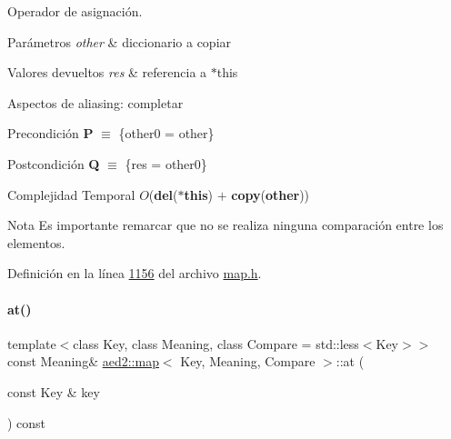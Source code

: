 Operador de asignación. 


\begin{DoxyParams}{Parámetros}
{\em other} & diccionario a copiar \\
\hline
\end{DoxyParams}

\begin{DoxyRetVals}{Valores devueltos}
{\em res} & referencia a $\ast$this\\
\hline
\end{DoxyRetVals}
\begin{DoxyParagraph}{Aspectos de aliasing\+:}
completar
\end{DoxyParagraph}
\begin{DoxyPrecond}{Precondición}
{\bfseries P} $\equiv$ \{other0 = other\} 
\end{DoxyPrecond}
\begin{DoxyPostcond}{Postcondición}
{\bfseries Q} $\equiv$ \{res = other0\}
\end{DoxyPostcond}

\begin{DoxyDescription}
\item[Complejidad Temporal]$O$({\bfseries del}({\bfseries $\ast$this}) $+$ {\bfseries copy}({\bfseries other}))
\end{DoxyDescription}

\begin{DoxyNote}{Nota}
Es importante remarcar que no se realiza ninguna comparación entre los elementos. 
\end{DoxyNote}


Definición en la línea \hyperlink{map_8h_source_l01156}{1156} del archivo \hyperlink{map_8h_source}{map.\+h}.

\mbox{\label{classaed2_1_1map_a579c9179b42175c23a1013ac7f1b876c_a579c9179b42175c23a1013ac7f1b876c}} 
\paragraph{\texorpdfstring{at()}{at()}\hspace{0.1cm}{\footnotesize\ttfamily [1/2]}}
{\footnotesize\ttfamily template$<$class Key, class Meaning, class Compare = std\+::less$<$\+Key$>$$>$ \\
const Meaning\& \hyperlink{classaed2_1_1map}{aed2\+::map}$<$ Key, Meaning, Compare $>$\+::at (\begin{DoxyParamCaption}\item[{const Key \&}]{key }\end{DoxyParamCaption}) const\hspace{0.3cm}{\ttfamily [inline]}}



